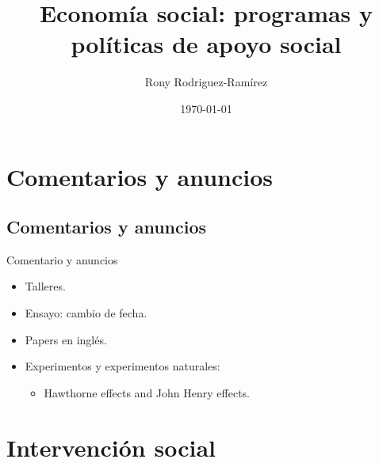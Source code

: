 \documentclass[11pt, aspectratio=169, compress]{beamer}
\title{Economía social: programas y políticas de apoyo social}
\author{Rony Rodriguez-Ramírez}
\institute{Economía Social y Humana | Grupo B018 \\Universidad Centroamericana}
\date{\today}
\begin{document}
	
\begin{frame}[plain]
	\maketitle  
\end{frame}

\section{Comentarios y anuncios}
\subsection{Comentarios y anuncios}
\begin{frame}[t]{Comentario y anuncios}
\begin{itemize}
	\item Talleres.  
	\item Ensayo: cambio de fecha. 
	\item Papers en inglés. 
	\item Experimentos y experimentos naturales: 
	\begin{itemize}
		\item Hawthorne effects and John Henry effects.
	\end{itemize}
\end{itemize}
\end{frame}
\section{Intervención social}
\end{document}
